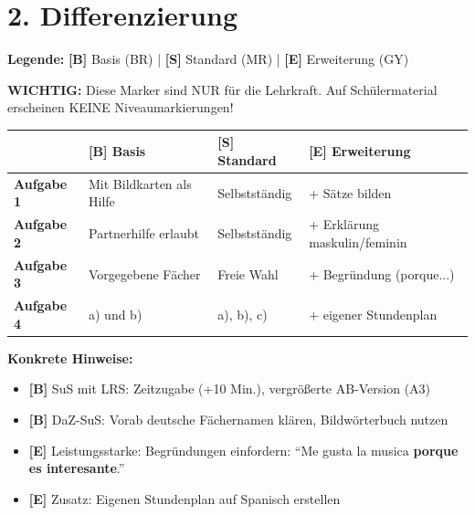 \documentclass[11pt, a4paper]{article}
\newcommand{\B}{\textcolor{basis}{\textbf{[B]}}}
\newcommand{\Std}{\textcolor{standard}{\textbf{[S]}}}
\newcommand{\E}{\textcolor{erweiterung}{\textbf{[E]}}}
\begin{document}

\section*{2. Differenzierung}

\begin{differenzierung}
\textbf{Legende:} \B{} Basis (BR) | \Std{} Standard (MR) | \E{} Erweiterung (GY)

\vspace{0.5em}

\textbf{WICHTIG:} Diese Marker sind NUR für die Lehrkraft. Auf Schülermaterial erscheinen KEINE Niveaumarkierungen!
\end{differenzierung}

\vspace{1em}

\begin{tabularx}{\textwidth}{|l|X|X|X|}
\hline
& \B{} \textbf{Basis} & \Std{} \textbf{Standard} & \E{} \textbf{Erweiterung} \\
\hline
\textbf{Aufgabe 1} & Mit Bildkarten als Hilfe & Selbstständig & + Sätze bilden \\
\hline
\textbf{Aufgabe 2} & Partnerhilfe erlaubt & Selbstständig & + Erklärung maskulin/feminin \\
\hline
\textbf{Aufgabe 3} & Vorgegebene Fächer & Freie Wahl & + Begründung (porque...) \\
\hline
\textbf{Aufgabe 4} & a) und b) & a), b), c) & + eigener Stundenplan \\
\hline
\end{tabularx}

\vspace{1em}

\textbf{Konkrete Hinweise:}
\begin{itemize}
    \item \B{} SuS mit LRS: Zeitzugabe (+10 Min.), vergrößerte AB-Version (A3)
    \item \B{} DaZ-SuS: Vorab deutsche Fächernamen klären, Bildwörterbuch nutzen
    \item \E{} Leistungsstarke: Begründungen einfordern: ``Me gusta la musica \textbf{porque es interesante}.''
    \item \E{} Zusatz: Eigenen Stundenplan auf Spanisch erstellen
\end{itemize}
\end{document}
